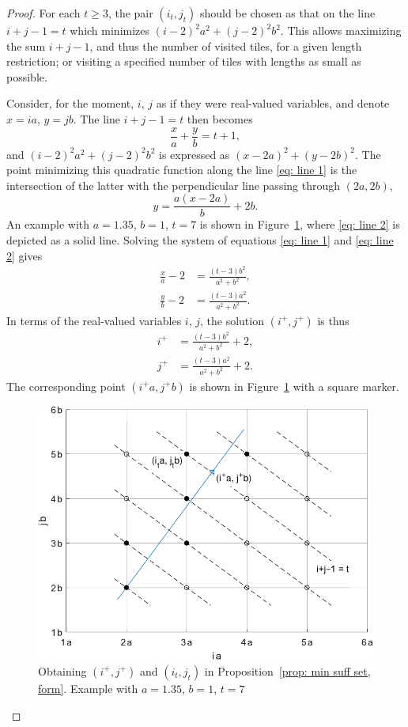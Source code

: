 \documentclass[12pt, a4paper]{article}
\newcommand{\tiles}{t} %
\newcommand{\isolr}{i^+}
\newcommand{\jsolr}{j^+}
\begin{document}
\begin{proof}
For each $\tiles \geq 3$, the pair $(i_\tiles,j_\tiles)$ should be chosen as that on the line $i+j-1=\tiles$ which minimizes $(i-2)^2 a^2 + (j-2)^2 b^2$. This allows maximizing the sum $i+j-1$, and thus the number of visited tiles, for a given length restriction; or visiting a specified number of tiles with lengths as small as possible.

Consider, for the moment, $i$, $j$ as if they were real-valued variables, and denote $x=ia$, $y=jb$. The line $i+j-1 = \tiles$ then becomes
\begin{equation}
\label{eq: line 1}
\frac x a + \frac y b = \tiles + 1,
\end{equation}
and $(i-2)^2 a^2 + (j-2)^2 b^2$ is expressed as $(x-2a)^2+(y-2b)^2$. The point minimizing this quadratic function along the line \eqref{eq: line 1} is the intersection of the latter with the perpendicular line passing through $(2a,2b)$,
\begin{equation}
\label{eq: line 2}
y = \frac {a (x-2a)} b + 2b.
\end{equation}
An example with $a=1.35$, $b=1$, $\tiles=7$ is shown in Figure~\ref{fig: min suff set, form}, where \eqref{eq: line 2} is depicted as a solid line. Solving the system of equations \eqref{eq: line 1} and \eqref{eq: line 2} gives 
\begin{align}
\frac x a - 2 &= \frac{(\tiles-3)b^2}{a^2+b^2}, \\
\frac y b - 2 &= \frac{(\tiles-3)a^2}{a^2+b^2}.
\end{align}
In terms of the real-valued variables $i$, $j$, the solution $(\isolr, \jsolr)$ is thus
\begin{align}
\label{eq: prop: min suff set, form: isolr}
\isolr &= \frac{(\tiles-3)b^2}{a^2+b^2} + 2, \\
\label{eq: prop: min suff set, form: jsolr}
\jsolr &= \frac{(\tiles-3)a^2}{a^2+b^2} + 2.
\end{align}
The corresponding point $(\isolr a, \jsolr b)$ is shown in Figure~\ref{fig: min suff set, form} with a square marker.

\begin{figure}%
\centering%
\includegraphics[width=.7\textwidth]{mss}%
\caption{Obtaining $(\isolr, \jsolr)$ and $(i_\tiles, j_\tiles)$ in Proposition~\ref{prop: min suff set, form}. Example with $a=1.35$, $b=1$, $\tiles=7$%
}%
\label{fig: min suff set, form}%
\end{figure}%


\end{proof}
\end{document}
